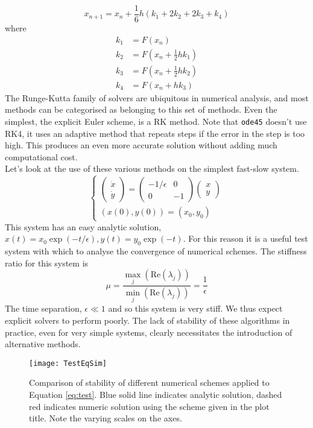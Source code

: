 $$ x_{n+1} = x_n +\frac{1}{6} h \left(k_1+2k_2+2k_3+k_4\right)$$
where
\begin{align*}
k_1 &= F(x_n)\\
k_2 &= F\left(x_n+\frac{1}{2}hk_1\right)\\
k_3 &= F\left(x_n +\frac{1}{2}hk_2\right)\\
k_4 &= F\left(x_n + hk_3\right)
\end{align*}
The Runge-Kutta family of solvers are ubiquitous in numerical analysis, and most methods can be categorised as belonging to this set of methods. Even the simplest, the explicit Euler scheme, is a RK method. Note that \texttt{ode45} doesn't use RK4, it uses an adaptive method that repeats steps if the error in the step is too high. This produces an even more accurate solution without adding much computational cost. \\

Let's look at the use of these various methods on the simplest fast-slow system.
		\begin{equation} \begin{cases}
		\begin{pmatrix} \dot{x}\\\dot{y}\end{pmatrix}=\begin{pmatrix}
		-1/\epsilon & 0 \\
		0& -1
		\end{pmatrix}\begin{pmatrix}
		x\\y 
		\end{pmatrix}\\
		(x(0),y(0))= (x_0,y_0)
		\end{cases}\label{eq:test}\end{equation}
This system has an easy analytic solution, $x(t) = x_0\exp(-t/\epsilon), y(t)=y_0 \exp(-t)$. For this reason it is a useful test system with which to analyse the convergence of numerical schemes. The stiffness ratio for this system is
$$ \mu =\frac{\max_j(\mathrm{Re}(\lambda_j))}{\min_j(\mathrm{Re}(\lambda_j))}= \frac{1}{\epsilon} $$
The time separation, $\epsilon \ll 1$ and so this system is very stiff. We thus expect explicit solvers to perform poorly. The lack of stability of these algorithms in practice, even for very simple systems, clearly necessitates the introduction of alternative methods.
\begin{figure}
	\centering
	\texttt{[image: TestEqSim]}
	\caption[Numerical Stability Comparison]{Comparison of stability of different numerical schemes applied to Equation \ref{eq:test}. Blue solid line indicates analytic solution, dashed red indicates numeric solution using the scheme given in the plot title. Note the varying scales on the axes.}
	\label{fig:numstab}
\end{figure}

